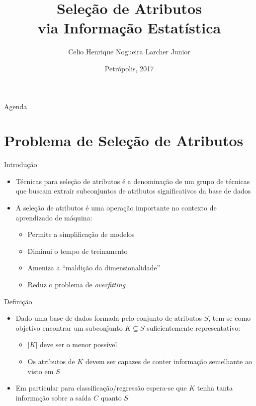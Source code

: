 \documentclass{beamer}
\title{Seleção de Atributos \\via  Informação Estatística}
\author{Celio Henrique Nogueira Larcher Junior}
\institute[Laboratório Nacional de Computação Científica] %
{
  Laboratório Nacional de Computação Científica
  }
\date{Petrópolis, 2017}
\begin{document}
\begin{frame}
  \titlepage
\end{frame}

\begin{frame}{Agenda}
\footnotesize
  \tableofcontents
\end{frame}





\section{Problema de Seleção de Atributos}

\begin{frame}{Introdução}
	\begin{itemize}
		\item Técnicas para seleção de atributos é a denominação de um grupo de técnicas que buscam extrair subconjuntos de atributos significativos da base de dados
		\item A seleção de atributos é uma operação importante no contexto de aprendizado de máquina:
		\begin{itemize}
			\item Permite a simplificação de modelos
			\item Diminui o tempo de treinamento
			\item Ameniza a ``maldição da dimensionalidade''
			\item Reduz o problema de \textit{overfitting}
		\end{itemize}
	\end{itemize}
\end{frame}


\begin{frame}{Definição}
	\begin{itemize}
		\item Dado uma base de dados formada pelo conjunto de atributos $S$, tem-se como objetivo encontrar um subconjunto $K \subseteq S$ suficientemente representativo:
		\begin{itemize}
			\item $|K|$ deve ser o menor possível
			\item Os atributos de $K$ devem ser capazes de conter informação semelhante ao visto em $S$
		\end{itemize}
		\item Em particular para classificação/regressão espera-se que $K$ tenha tanta informação sobre a saída $C$ quanto $S$
	\end{itemize}
\end{frame}
\end{document}
